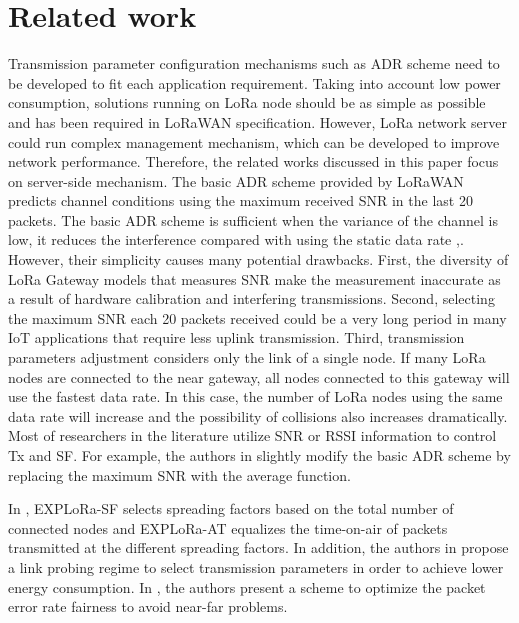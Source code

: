 \section{Related work} \label{sec:Related work}


Transmission parameter configuration mechanisms such as ADR scheme need to be developed to fit each application requirement.
Taking into account low power consumption,
	solutions running on LoRa node should be as simple as possible and has been required in LoRaWAN specification.
However,
	LoRa network server could run complex management mechanism,
	which can be developed to improve network performance.
Therefore,
	the related works discussed in this paper focus on server-side mechanism.
The basic ADR scheme \cite{LorawanSpecification} provided by LoRaWAN predicts channel conditions using the maximum received \ac{SNR} in the last 20 packets.
The basic ADR scheme is sufficient when the variance of the channel is low, 
	it reduces the interference compared with using the static data rate \cite{bor_lora_2016} ,\cite{slabicki_adaptive_2018}.
However,
	their simplicity causes many potential drawbacks.
First,
	the diversity of LoRa Gateway models that measures \ac{SNR} make the measurement inaccurate as a result of hardware calibration and interfering transmissions.
Second,
	selecting the maximum \ac{SNR} each 20 packets received could be a very long period in many IoT applications that require less uplink transmission.
Third,
	transmission parameters adjustment considers only the link of a single node.
If many LoRa nodes are connected to the near gateway,
	all nodes connected to this gateway will use the fastest data rate.
In this case,
	the number of LoRa nodes using the same data rate will increase and the possibility of collisions also increases dramatically.
Most of researchers in the literature utilize \ac{SNR} or \ac{RSSI} information to control \ac{Tx} and \ac{SF}.
For example,
	the authors in \cite{slabicki_adaptive_2018} slightly modify the basic ADR scheme by replacing the maximum \ac{SNR} with the average function.

%

In \cite{cuomo_explora_2017},
	EXPLoRa-SF selects spreading factors based on the total number of connected nodes and EXPLoRa-AT equalizes the time-on-air of packets transmitted at the different spreading factors.
In addition,
	the authors in \cite{bor_lora_2017} propose a link probing regime to select transmission parameters in order to achieve lower energy consumption.
In \cite{reynders_power_2017},
	the authors present a scheme to optimize the packet error rate fairness to avoid near-far problems.

